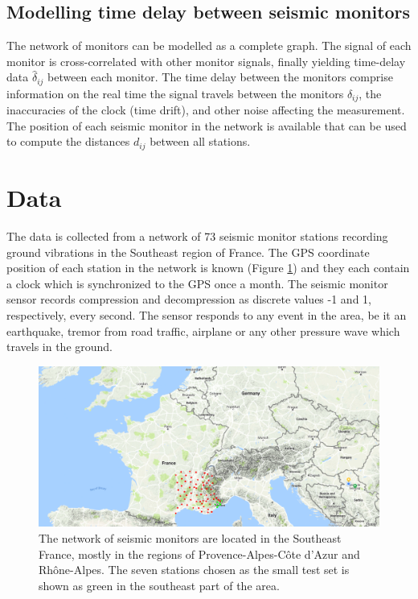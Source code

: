 \documentclass[12pt,a4paper,english]{article}
\begin{document}
\subsection{Modelling time delay between seismic monitors}
The network of monitors can be modelled as a complete graph. The signal of each monitor is cross-correlated with other monitor signals, finally yielding time-delay data $\hat{\delta}_{ij}$ between each monitor. The time delay between the monitors comprise information on the real time the signal travels between the monitors $\delta_{ij}$, the inaccuracies of the clock (time drift), and other noise affecting the measurement. The position of each seismic monitor in the network is available that can be used to compute the distances $d_{ij}$ between all stations.

\section{Data}

The data is collected from a network of 73 seismic monitor stations recording ground vibrations in the Southeast region of France. The GPS coordinate position of each station in the network is known (Figure \ref{fig:monitornetwork}) and they each contain a clock which is synchronized to the GPS once a month. The seismic monitor sensor records compression and decompression as discrete values -1 and 1, respectively, every second. The sensor responds to any event in the area, be it an earthquake, tremor from road traffic, airplane or any other pressure wave which travels in the ground.

\begin{figure}[ht]
  \begin{center}   
   \includegraphics[width=\textwidth]{InitialStationSet.png}
  \end{center}
  \caption{The network of seismic monitors are located in the Southeast France, mostly in the regions of Provence-Alpes-C\^{o}te d'Azur and Rh\^{o}ne-Alpes. The seven stations chosen as the small test set is shown as green in the southeast part of the area.}\label{fig:monitornetwork}
\end{figure}
\end{document}
